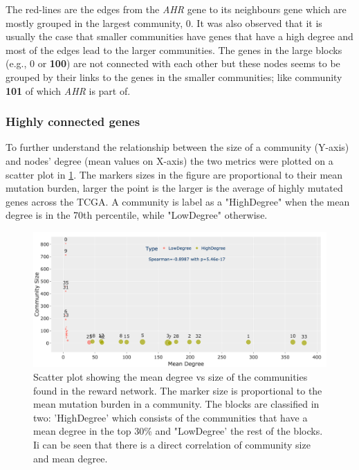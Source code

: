 The red-lines are the edges from the \textit{AHR} gene to its neighbours gene which are mostly grouped in the largest community, 0. It was also observed that it is usually the case that smaller communities have genes that have a high degree and most of the edges lead to the larger communities. The genes in the large blocks (e.g., 0 or \textbf{100}) are not connected with each other but these nodes seems to be grouped by their links to the genes in the smaller communities; like community \textbf{101} of which \textit{AHR} is part of. 


\subsubsection*{Highly connected genes} \label{s:N_II:high_conn}

To further understand the relationship between the size of a community (Y-axis) and nodes' degree (mean values on X-axis) the two metrics were plotted on a scatter plot in \cref{fig:N_II:largeSmall_com}. The markers sizes in the figure are proportional to their mean mutation burden, larger the point is the larger is the average of highly mutated genes across the TCGA. A community is label as a "HighDegree" when the mean degree is in the 70th percentile, while "LowDegree" otherwise. 

\begin{figure}[!htb]    
    \centering
    \includegraphics[width=1.0\textwidth,height=1.0\textheight,keepaspectratio]{Sections/Network_II/resources/reward/LargeSmall_com.png}
    \caption{Scatter plot showing the mean degree vs size of the communities found in the reward network. The marker size is proportional to the mean mutation burden in a community. The blocks are classified in two: 'HighDegree' which consists of the communities that have a mean degree in the top 30\% and "LowDegree' the rest of the blocks. Ii can be seen that there is a direct correlation of community size and mean degree.}
    \label{fig:N_II:largeSmall_com}
\end{figure}

